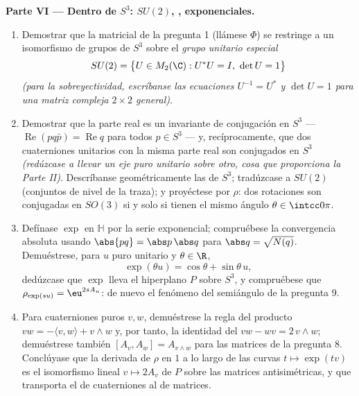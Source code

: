 \begin{problem}
\medskip
\noindent\textbf{Parte VI --- Dentro de $S^3$: $SU(2)$,
, exponenciales.}
\begin{enumerate}[resume]
  \item Demostrar que la
   matricial de la
  pregunta 1 (llámese $\Phi$) se restringe a un isomorfismo de grupos de
  $S^3$ sobre el \emph{grupo unitario especial}
        \[
        SU(2) = \bigl\{U \in M_2(\C) : U^*U = I,\ \det U =
        1\bigr\}
        \]
        \emph{(para la sobreyectividad, escríbanse las ecuaciones
        $U^{-1} = U^*$ y $\det U = 1$ para una matriz compleja
        $2\times2$ general)}. \item Demostrar que la parte real es un
        invariante de conjugación en $S^3$ ---
        $\operatorname{Re}(pq\bar p) =
        \operatorname{Re}q$ para todos $p \in S^3$ --- y,
        recíprocamente, que dos cuaterniones unitarios con la misma
        parte real son conjugados en $S^3$ \emph{(redúzcase a llevar un
        eje puro unitario sobre otro, cosa que proporciona la Parte
        II)}. Descríbanse geométricamente las
         de $S^3$;
        tradúzcase a $SU(2)$ (conjuntos de nivel de la traza); y
        proyéctese por $\rho$: dos rotaciones son conjugadas en $SO(3)$
        si y solo si tienen el mismo ángulo $\theta \in \intcc0\pi$.
        \item Defínase $\exp$ en $\mathbb H$ por la serie exponencial;
        compruébese la convergencia absoluta usando
        $\abs{pq} = \abs p\,\abs q$ para $\abs q =
        \sqrt{N(q)}$. Demuéstrese, para $u$ puro unitario y $\theta
        \in \R$,
        \[
        \exp(\theta u) = \cos\theta + \sin\theta\,u ,
        \]
        dedúzcase que $\exp$ lleva el hiperplano $P$ sobre $S^3$, y
        compruébese que $\rho_{\exp(su)} =
        \eu^{2sA_u}$: de nuevo el fenómeno del semiángulo de la pregunta
        9. \item Para cuaterniones puros $v, w$, demuéstrese la regla
        del producto $vw = -\langle v, w\rangle + v\wedge w$ y, por
        tanto, la identidad del
        $vw - wv = 2\,v\wedge w$; demuéstrese también
        $[A_v, A_w] = A_{v\wedge w}$ para las matrices de la pregunta 8.
        Conclúyase que la derivada de $\rho$ en $1$ a lo largo de las
        curvas $t \mapsto \exp(tv)$ es el isomorfismo lineal
        $v \mapsto 2A_v$ de $P$ sobre las matrices antisimétricas, y que
        transporta el  de
        cuaterniones al  de
        matrices.
\end{enumerate}


\end{problem}

